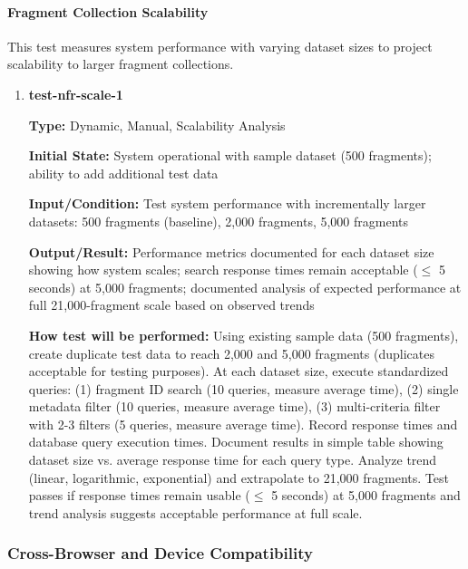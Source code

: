 \documentclass[12pt, titlepage]{article}
\begin{document}
\paragraph{Fragment Collection Scalability}

This test measures system performance with varying dataset sizes to project scalability to larger fragment collections.

\begin{enumerate}

\item \textbf{test-nfr-scale-1}

\textbf{Type:} Dynamic, Manual, Scalability Analysis

\textbf{Initial State:} System operational with sample dataset (500 fragments); ability to add additional test data

\textbf{Input/Condition:} Test system performance with incrementally larger datasets: 500 fragments (baseline), 2,000 fragments, 5,000 fragments

\textbf{Output/Result:} Performance metrics documented for each dataset size showing how system scales; search response times remain acceptable ($\leq$ 5 seconds) at 5,000 fragments; documented analysis of expected performance at full 21,000-fragment scale based on observed trends

\textbf{How test will be performed:} Using existing sample data (500 fragments), create duplicate test data to reach 2,000 and 5,000 fragments (duplicates acceptable for testing purposes). At each dataset size, execute standardized queries: (1) fragment ID search (10 queries, measure average time), (2) single metadata filter (10 queries, measure average time), (3) multi-criteria filter with 2-3 filters (5 queries, measure average time). Record response times and database query execution times. Document results in simple table showing dataset size vs. average response time for each query type. Analyze trend (linear, logarithmic, exponential) and extrapolate to 21,000 fragments. Test passes if response times remain usable ($\leq$ 5 seconds) at 5,000 fragments and trend analysis suggests acceptable performance at full scale.

\end{enumerate}

\subsubsection{Cross-Browser and Device Compatibility}
\end{document}
